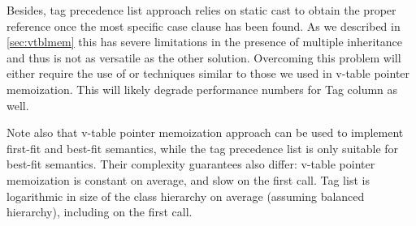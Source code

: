 Besides, tag precedence list approach relies on static cast to obtain the 
proper reference once the most specific case clause has been found. As we 
described in \textsection\ref{sec:vtblmem} this has severe limitations in the 
presence of multiple inheritance and thus is not as versatile as the other 
solution. Overcoming this problem will either require the use of 
 or techniques similar to those we used in v-table pointer 
memoization. This will likely degrade performance numbers for Tag column as well.

Note also that v-table pointer memoization approach can be used to implement 
first-fit and best-fit semantics, while the tag precedence list is only suitable 
for best-fit semantics. Their complexity guarantees also differ: v-table pointer 
memoization is constant on average, and slow on the first call. Tag list is 
logarithmic in size of the class hierarchy on average (assuming balanced 
hierarchy), including on the first call.
